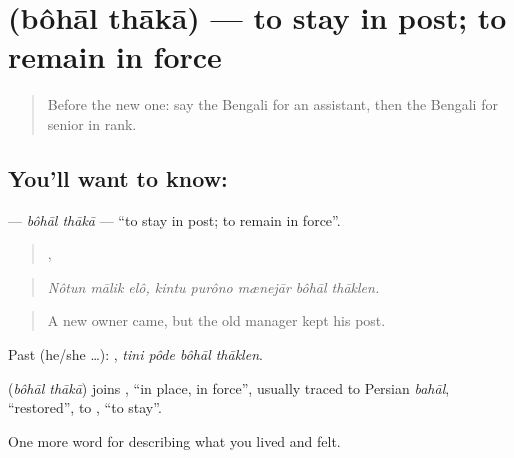 \section[\texorpdfstring{\bn{বহাল} \bn{থাকা} (bôhāl thākā)}{বহাল থাকা (bôhāl thākā)}]{  (bôhāl thākā) — to stay in post; to remain in force}

\label{lesson:BN-C496-bohal-thaka}



\begin{quote}
Before the new one: say the Bengali for an assistant, then the Bengali for senior in rank.
\end{quote}

\subsection*{You'll want to know:  }
\textbf{ } — \emph{bôhāl thākā} — \textquotedblleft{}to stay in post; to remain in force\textquotedblright{}.

\begin{quote}
  ,     
\end{quote}

\begin{quote}
\emph{Nôtun mālik elô, kintu purôno mænejār bôhāl thāklen.}
\end{quote}

\begin{quote}
A new owner came, but the old manager kept his post.
\end{quote}

Past (he/she …):    , \emph{tini pôde bôhāl thāklen}.

\begin{cousinweb}
\textbf{ } (\emph{bôhāl thākā}) joins , \textquotedblleft{}in place, in force\textquotedblright{}, usually traced to Persian \emph{bahāl}, \textquotedblleft{}restored\textquotedblright{}, to , \textquotedblleft{}to stay\textquotedblright{}.
\end{cousinweb}

\begin{grammarlens}[title={What you've built}]
One more word for describing what you lived and felt.
\end{grammarlens}

